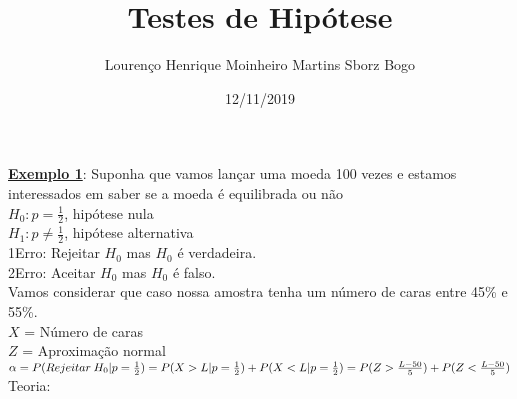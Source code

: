 \documentclass[12pt, oneside]{article}
\title{Testes de Hipótese}
\author{Lourenço Henrique Moinheiro Martins Sborz Bogo}
\date{12/11/2019}
\begin{document}
\maketitle
\noindent\textbf{\underline{Exemplo 1}}: Suponha que vamos lançar uma moeda 100 vezes e estamos interessados em saber se a moeda é equilibrada ou não\\
$H_0:p=\frac{1}{2}$, hipótese nula\\
$H_1:p\neq\frac{1}{2}$, hipótese alternativa\\
1\textordmasculine Erro: Rejeitar $H_0$ mas $H_0$ é verdadeira.\\
2\textordmasculine Erro: Aceitar  $H_0$ mas $H_0$ é falso.\\
Vamos considerar que caso nossa amostra tenha um número de caras entre 45\% e 55\%.\\
$X$ = Número de caras\\
$Z$ = Aproximação normal\\
$\alpha = P(Rejeitar\: H_0|p=\frac{1}{2})=P(X>L|p=\frac{1}{2})+P(X<L|p=\frac{1}{2})=P(Z>\frac{L-50}{5})+\\P(Z<\frac{L-50}{5})$
Teoria:\\
\end{document}
